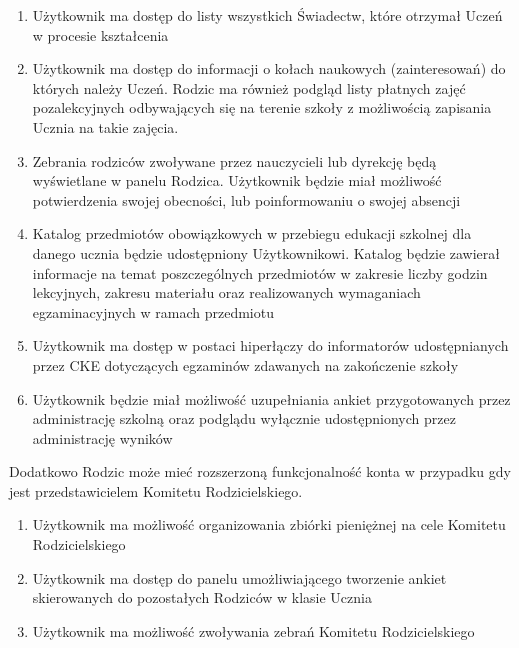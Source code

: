 \documentclass{article}
\begin{document}
\begin{enumerate}
	\item Użytkownik ma dostęp do listy wszystkich Świadectw, które otrzymał Uczeń w procesie kształcenia
	\item Użytkownik ma dostęp do informacji o kołach naukowych (zainteresowań) do których należy Uczeń. Rodzic ma również podgląd listy płatnych zajęć pozalekcyjnych odbywających się na terenie szkoły z możliwością zapisania Ucznia na takie zajęcia.
	\item Zebrania rodziców zwoływane przez nauczycieli lub dyrekcję będą wyświetlane w panelu Rodzica. Użytkownik będzie miał możliwość potwierdzenia swojej obecności, lub poinformowaniu o swojej absencji
	\item Katalog przedmiotów obowiązkowych w przebiegu edukacji szkolnej dla danego ucznia będzie udostępniony Użytkownikowi. Katalog będzie zawierał informacje na temat poszczególnych przedmiotów w zakresie liczby godzin lekcyjnych, zakresu materiału oraz realizowanych wymaganiach egzaminacyjnych w ramach przedmiotu
	\item Użytkownik ma dostęp w postaci hiperłączy do informatorów udostępnianych przez CKE dotyczących egzaminów zdawanych na zakończenie szkoły
	\item Użytkownik będzie miał możliwość uzupełniania ankiet przygotowanych przez administrację szkolną oraz podglądu wyłącznie udostępnionych przez administrację wyników
\end{enumerate}
	Dodatkowo Rodzic może mieć rozszerzoną funkcjonalność konta w przypadku gdy jest przedstawicielem Komitetu Rodzicielskiego.
	\begin{enumerate}
		\item Użytkownik ma możliwość organizowania zbiórki pieniężnej na cele Komitetu Rodzicielskiego
		\item Użytkownik ma dostęp do panelu umożliwiającego tworzenie ankiet skierowanych do pozostałych Rodziców w klasie Ucznia
		\item Użytkownik ma możliwość zwoływania zebrań Komitetu Rodzicielskiego
	\end{enumerate}
\end{document}

